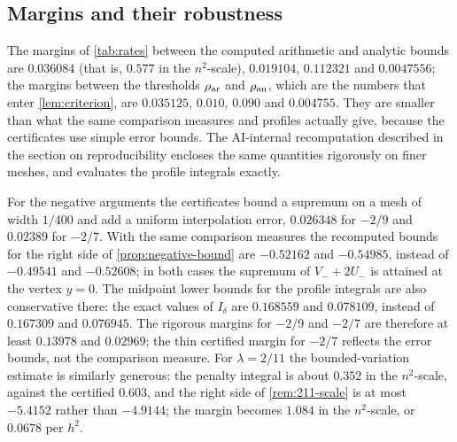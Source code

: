 \subsection{Margins and their robustness}\label{sec:margins}
The margins of \cref{tab:rates} between the computed arithmetic and analytic bounds are $0.036084$ (that is, $0.577$ in the $n^2$-scale), $0.019104$, $0.112321$ and $0.0047556$; the margins between the thresholds $\rho_{\mathrm{ar}}$ and $\rho_{\mathrm{an}}$, which are the numbers that enter \cref{lem:criterion}, are $0.035125$, $0.010$, $0.090$ and $0.004755$. They are smaller than what the same comparison measures and profiles actually give, because the certificates use simple error bounds. The AI-internal recomputation described in the section on reproducibility encloses the same quantities rigorously on finer meshes, and evaluates the profile integrals exactly.

For the negative arguments the certificates bound a supremum on a mesh of width $1/400$ and add a uniform interpolation error, $0.026348$ for $-2/9$ and $0.02389$ for $-2/7$. With the same comparison measures the recomputed bounds for the right side of \cref{prop:negative-bound} are $-0.52162$ and $-0.54985$, instead of $-0.49541$ and $-0.52608$; in both cases the supremum of $V_-+2U_-$ is attained at the vertex $y=0$. The midpoint lower bounds for the profile integrals are also conservative there: the exact values of $I_\delta$ are $0.168559$ and $0.078109$, instead of $0.167309$ and $0.076945$. The rigorous margins for $-2/9$ and $-2/7$ are therefore at least $0.13978$ and $0.02969$; the thin certified margin for $-2/7$ reflects the error bounds, not the comparison measure. For $\lambda=2/11$ the bounded-variation estimate is similarly generous: the penalty integral is about $0.352$ in the $n^2$-scale, against the certified $0.603$, and the right side of \cref{rem:211-scale} is at most $-5.4152$ rather than $-4.9144$; the margin becomes $1.084$ in the $n^2$-scale, or $0.0678$ per $h^2$.

